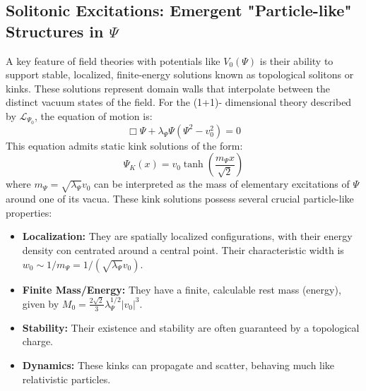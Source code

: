 \documentclass{report}
\begin{document}
    \subsection{Solitonic Excitations: Emergent "Particle-like" Structures in $\Psi$}
    \label{subsec:solitonic_excitations}
    A key feature of field theories with potentials like $V_0(\Psi)$ is their ability to support stable,
    localized, finite-energy solutions known as topological solitons or kinks. These solutions represent
    domain walls that interpolate between the distinct vacuum states of the field. For the (1+1)-
    dimensional theory described by $\mathcal{L}_{\Psi_0}$, the equation of motion is:
    \begin{equation}
        \Box\Psi + \lambda_{\Psi}\Psi(\Psi^2 - v_0^2) = 0
    \end{equation}
    This equation admits static kink solutions of the form:
    \begin{equation}
        \Psi_K(x) = v_0 \tanh\left(\frac{m_{\Psi}x}{\sqrt{2}}\right)
    \end{equation}
    where $m_{\Psi} = \sqrt{\lambda_{\Psi}}v_0$ can be interpreted as the mass of elementary excitations of $\Psi$ around one of its vacua. These kink solutions possess several crucial particle-like properties:
    \begin{itemize}
        \item \textbf{Localization:} They are spatially localized configurations, with their energy density con centrated around a central point. Their characteristic width is $w_0 \sim 1/m_{\Psi} = 1/(\sqrt{\lambda_{\Psi}}v_0)$.
        \item \textbf{Finite Mass/Energy:} They have a finite, calculable rest mass (energy), given by $M_0 = \frac{2\sqrt{2}}{3}\lambda_{\Psi}^{1/2}|v_0|^3$.
        \item \textbf{Stability:} Their existence and stability are often guaranteed by a topological charge.
        \item \textbf{Dynamics:} These kinks can propagate and scatter, behaving much like relativistic particles.
    \end{itemize}
\end{document}
